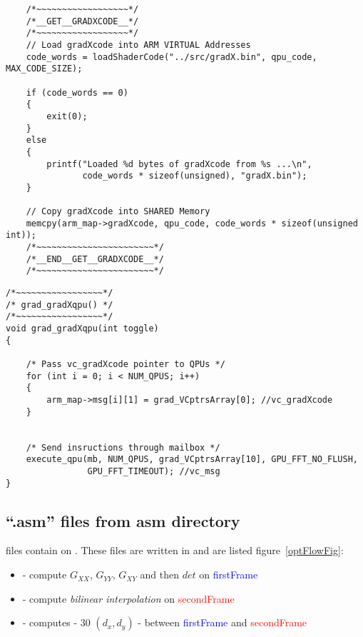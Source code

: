 \begin{lstlisting}
    /*~~~~~~~~~~~~~~~~~~*/
    /*__GET__GRADXCODE__*/
    /*~~~~~~~~~~~~~~~~~~*/
    // Load gradXcode into ARM VIRTUAL Addresses
    code_words = loadShaderCode("../src/gradX.bin", qpu_code, MAX_CODE_SIZE);

    if (code_words == 0)
    {
        exit(0);
    }
    else
    {
        printf("Loaded %d bytes of gradXcode from %s ...\n",
               code_words * sizeof(unsigned), "gradX.bin");
    }

    // Copy gradXcode into SHARED Memory
    memcpy(arm_map->gradXcode, qpu_code, code_words * sizeof(unsigned int));
    /*~~~~~~~~~~~~~~~~~~~~~~~*/
    /*__END__GET__GRADXCODE__*/
    /*~~~~~~~~~~~~~~~~~~~~~~~*/
\end{lstlisting}

\begin{lstlisting}
/*~~~~~~~~~~~~~~~~~*/
/* grad_gradXqpu() */
/*~~~~~~~~~~~~~~~~~*/
void grad_gradXqpu(int toggle)
{

    /* Pass vc_gradXcode pointer to QPUs */
    for (int i = 0; i < NUM_QPUS; i++)
    {
        arm_map->msg[i][1] = grad_VCptrsArray[0]; //vc_gradXcode
    }


    /* Send insructions through mailbox */
    execute_qpu(mb, NUM_QPUS, grad_VCptrsArray[10], GPU_FFT_NO_FLUSH,
                GPU_FFT_TIMEOUT); //vc_msg
}
\end{lstlisting}


\subsection{\enquote{.asm} files from asm directory}

 files contain  on \vc. These files are written in  and are listed figure~\ref{optFlowFig}:
\begin{itemize}
	\item {} - compute $G_{XX}$, $G_{YY}$, $G_{XY}$ and then $det$ on \textcolor{blue}{firstFrame}
	\item {} - compute \emph{bilinear interpolation} on \textcolor{red}{secondFrame}
	\item {} - computes \flow{} - 30 $(d_{x},d_{y})$ - between \textcolor{blue}{firstFrame} and \textcolor{red}{secondFrame}
\end{itemize}

